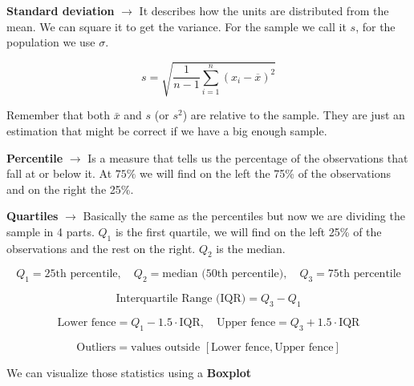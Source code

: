 \vspace{10pt}

\textbf{Standard deviation} $\xrightarrow{}$ It describes how the units are distributed from the mean. We can square it to get the variance. For the sample we call it $s$, for the population we use $\sigma$. 

\[
s = \sqrt{\frac{1}{n-1} \sum_{i=1}^n (x_i - \overline{x})^2}
\]

Remember that both $\bar{x}$ and $s$ (or $s^2$) are relative to the sample. They are just an estimation that might be correct if we have a big enough sample.

\vspace{10pt}

\textbf{Percentile} $\xrightarrow{}$ Is a measure that tells us the percentage of the observations that fall at or below it. At $75\%$ we will find on the left the 75\% of the observations and on the right the 25\%.

\vspace{10pt}


\textbf{Quartiles} $\xrightarrow{}$ Basically the same as the percentiles but now we are dividing the sample in 4 parts. $Q_1$ is the first quartile, we will find on the left 25\% of the observations and the rest on the right. $Q_2$ is the median.

\[
Q_1 = \text{25th percentile}, \quad
Q_2 = \text{median (50th percentile)}, \quad
Q_3 = \text{75th percentile}
\]

\[
\text{Interquartile Range (IQR)} = Q_3 - Q_1
\]

\[
\text{Lower fence} = Q_1 - 1.5 \cdot \text{IQR}, \quad
\text{Upper fence} = Q_3 + 1.5 \cdot \text{IQR}
\]

\[
\text{Outliers} = \text{values outside } [\text{Lower fence}, \text{Upper fence}]
\]

\vspace{10pt}

We can visualize those statistics using a \textbf{Boxplot}




